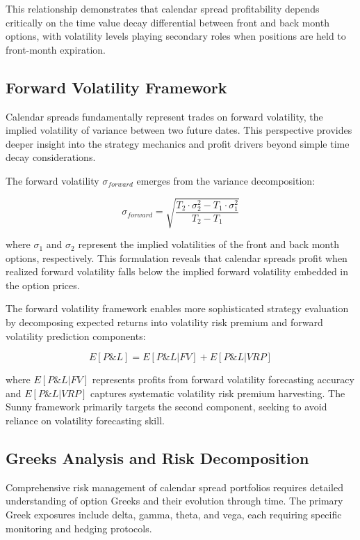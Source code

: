 \documentclass[
  american,
  11pt,
  11pt,
  letterpaper,
  onecolumn]{article}
\begin{document}
This relationship demonstrates that calendar spread profitability
depends critically on the time value decay differential between front
and back month options, with volatility levels playing secondary roles
when positions are held to front-month expiration.

\subsection{Forward Volatility
Framework}\label{forward-volatility-framework}

Calendar spreads fundamentally represent trades on forward volatility,
the implied volatility of variance between two future dates. This
perspective provides deeper insight into the strategy mechanics and
profit drivers beyond simple time decay considerations.

The forward volatility \(\sigma_{forward}\) emerges from the variance
decomposition:

\[\sigma_{forward} = \sqrt{\frac{T_2 \cdot \sigma_2^2 - T_1 \cdot \sigma_1^2}{T_2 - T_1}}\]

where \(\sigma_1\) and \(\sigma_2\) represent the implied volatilities
of the front and back month options, respectively. This formulation
reveals that calendar spreads profit when realized forward volatility
falls below the implied forward volatility embedded in the option
prices.

The forward volatility framework enables more sophisticated strategy
evaluation by decomposing expected returns into volatility risk premium
and forward volatility prediction components:

\[E[P\&L] = E[P\&L|FV] + E[P\&L|VRP]\]

where \(E[P\&L|FV]\) represents profits from forward volatility
forecasting accuracy and \(E[P\&L|VRP]\) captures systematic volatility
risk premium harvesting. The Sunny framework primarily targets the
second component, seeking to avoid reliance on volatility forecasting
skill.

\subsection{Greeks Analysis and Risk
Decomposition}\label{greeks-analysis-and-risk-decomposition}

Comprehensive risk management of calendar spread portfolios requires
detailed understanding of option Greeks and their evolution through
time. The primary Greek exposures include delta, gamma, theta, and vega,
each requiring specific monitoring and hedging protocols.
\end{document}
